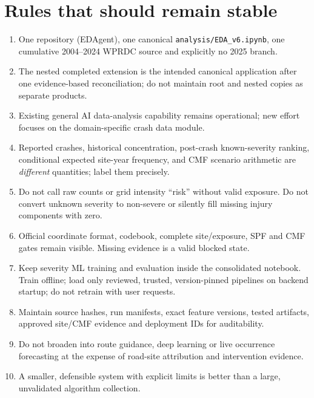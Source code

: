 \documentclass[11pt,a4paper,openany]{report}
\newcommand{\pathcode}[1]{\nolinkurl{#1}}
\begin{document}
\section{Rules that should remain stable}
\begin{enumerate}
\item One repository (EDAgent), one canonical \pathcode{analysis/EDA_v6.ipynb}, one cumulative 2004--2024 WPRDC source and explicitly no 2025 branch.
\item The nested completed extension is the intended canonical application after one evidence-based reconciliation; do not maintain root and nested copies as separate products.
\item Existing general AI data-analysis capability remains operational; new effort focuses on the domain-specific crash data module.
\item Reported crashes, historical concentration, post-crash known-severity ranking, conditional expected site-year frequency, and CMF scenario arithmetic are \emph{different} quantities; label them precisely.
\item Do not call raw counts or grid intensity ``risk'' without valid exposure. Do not convert unknown severity to non-severe or silently fill missing injury components with zero.
\item Official coordinate format, codebook, complete site/exposure, SPF and CMF gates remain visible. Missing evidence is a valid blocked state.
\item Keep severity ML training and evaluation inside the consolidated notebook. Train offline; load only reviewed, trusted, version-pinned pipelines on backend startup; do not retrain with user requests.
\item Maintain source hashes, run manifests, exact feature versions, tested artifacts, approved site/CMF evidence and deployment IDs for auditability.
\item Do not broaden into route guidance, deep learning or live occurrence forecasting at the expense of road-site attribution and intervention evidence.
\item A smaller, defensible system with explicit limits is better than a large, unvalidated algorithm collection.
\end{enumerate}
\end{document}
